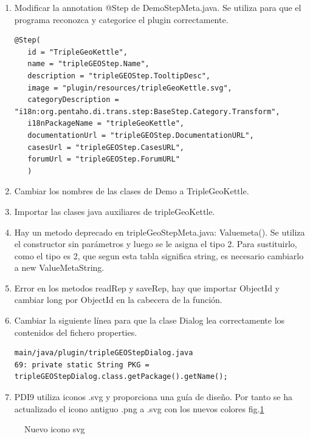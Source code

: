 \begin{enumerate}
    \item Modificar la annotation @Step de DemoStepMeta.java. Se utiliza para que el programa reconozca y
        categorice el plugin correctamente.
\begin{lstlisting}
@Step(
   id = "TripleGeoKettle",
   name = "tripleGEOStep.Name",
   description = "tripleGEOStep.TooltipDesc",
   image = "plugin/resources/tripleGeoKettle.svg",
   categoryDescription = "i18n:org.pentaho.di.trans.step:BaseStep.Category.Transform",
   i18nPackageName = "tripleGeoKettle",
   documentationUrl = "tripleGEOStep.DocumentationURL",
   casesUrl = "tripleGEOStep.CasesURL",
   forumUrl = "tripleGEOStep.ForumURL"
   )
\end{lstlisting}

    \item Cambiar los nombres de las clases de Demo a TripleGeoKettle.
    \item Importar las clases java auxiliares de tripleGeoKettle.
    \item Hay un metodo deprecado en tripleGeoStepMeta.java: Valuemeta(). Se utiliza el constructor sin
        parámetros y luego se le asigna el tipo 2. Para sustituirlo, como el tipo es 2, que segun esta
        tabla\cite{tabla-string} significa string, es necesario cambiarlo a new ValueMetaString.

\item Error en los metodos readRep y saveRep, hay que importar ObjectId
 y cambiar long por ObjectId en la cabecera de la función.

\item Cambiar la siguiente línea para que la clase Dialog lea correctamente los contenidos del fichero properties.

\begin{lstlisting}
main/java/plugin/tripleGEOStepDialog.java
69: private static String PKG = tripleGEOStepDialog.class.getPackage().getName();
\end{lstlisting}

\item PDI9 utiliza iconos .svg y proporciona una guía de diseño\cite{guia-diseno}. Por tanto se ha actualizado el
    icono antiguo .png a .svg con los nuevos colores fig.\ref{fig:icono-TGK}
\end{enumerate}

\begin{figure}[H]
  \centering
    
    \caption{Nuevo icono svg}
    \label{fig:icono-TGK}
    \centering
\end{figure}

